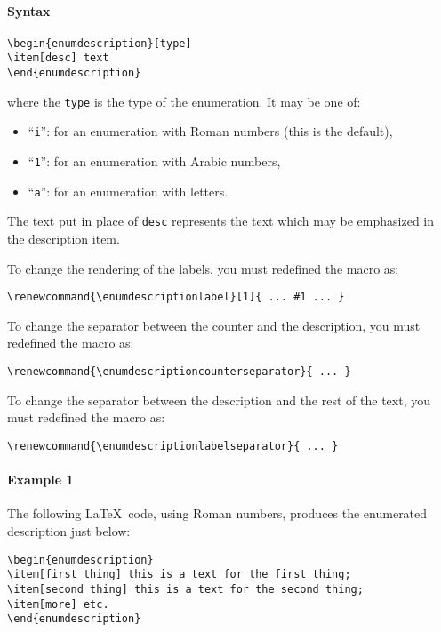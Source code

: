 \documentclass[book,taskpackage,specpackage,codepackage]{upmethodology-document}
\begin{document}
\paragraph{Syntax}
\begin{verbatim}
\begin{enumdescription}[type]
\item[desc] text
\end{enumdescription}
\end{verbatim}
where the \texttt{type} is the type of the enumeration. It may be one of:
\begin{itemize}
\item ``\texttt{i}'': for an enumeration with Roman numbers (this is the default),
\item ``\texttt{1}'': for an enumeration with Arabic numbers,
\item ``\texttt{a}'': for an enumeration with letters.
\end{itemize}
The text put in place of \texttt{desc} represents the text which may be emphasized in the description item.


To change the rendering of the labels, you must redefined the macro as:
\begin{verbatim}
\renewcommand{\enumdescriptionlabel}[1]{ ... #1 ... }
\end{verbatim}

To change the separator between the counter and the description, you must redefined the macro as:
\begin{verbatim}
\renewcommand{\enumdescriptioncounterseparator}{ ... }
\end{verbatim}

To change the separator between the description and the rest of the text, you must redefined the macro as:
\begin{verbatim}
\renewcommand{\enumdescriptionlabelseparator}{ ... }
\end{verbatim}

\paragraph{Example 1} The following \LaTeX~code, using Roman numbers, produces the enumerated description just below:
\begin{verbatim}
\begin{enumdescription}
\item[first thing] this is a text for the first thing;
\item[second thing] this is a text for the second thing;
\item[more] etc.
\end{enumdescription}
\end{verbatim}
\end{document}
